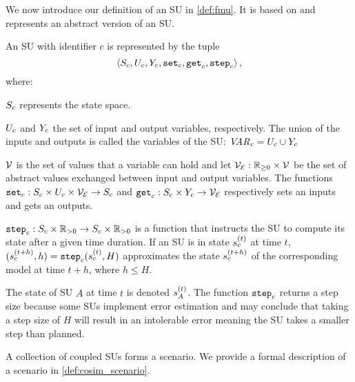 We now introduce our definition of an SU in \cref{def:fmu}.
It is based on \cite{Broman2013,Gomes2019c,thrane2021} and represents an abstract version of an SU.

\begin{definition}\label{def:fmu}
  An SU with identifier $c$ is represented by the tuple
  $$ \left\langle S_{c}, U_{c}, Y_{c}, \mathtt{set}_{c}, \mathtt{get}_{c}, \mathtt{step}_{c} \right\rangle ,$$
  where:
  \begin{compactitem}
    \item $S_{c}$ represents the state space.
    \item $U_{c}$ and $Y_{c}$ the set of input and output variables, respectively.
    The union of the inputs and outputs is called the variables of the SU:
    $\mathit{VAR_{c}} = U_{c} \cup Y_{c}$ 
    \item $\mathcal{V}$ is the set of values that a variable can hold and let $\mathcal{V_{E}} : \mathbb{R}_{\geq 0} \times \mathcal{V}$ be the set of abstract values exchanged between input and output variables.
    The functions
    $\mathtt{set}_{c} : S_{c} \times U_{c} \times \mathcal{V_{E}} \to S_{c}$ and $\mathtt{get}_{c}: S_{c} \times Y_{c} \to \mathcal{V_{E}}$ respectively sets an inputs and gets an outputs. 
    \item $\mathtt{step}_{c}: S_{c} \times \mathbb{R}_{> 0} \to S_{c} \times \mathbb{R}_{> 0} $ is a function that instructs the SU to compute its state after a given time duration. If an SU is in state $s_{c}^{(t)}$ at time $t$, $(s_{c}^{(t+h)}, h) = \mathtt{step}_{c}(s_{c}^{(t)}, H)$ approximates the state $s_{c}^{(t+h)}$ of the corresponding model at time $t+h$, where $h \leq H$. 
  \end{compactitem}
\end{definition}

The state of SU $A$ at time $t$ is denoted $s_{A}^{(t)}$.
The function $\mathtt{step}_{c}$ returns a step size because some SUs implement error estimation and may conclude that taking a step size of $H$ will result in an intolerable error meaning the SU takes a smaller step than planned.

A collection of coupled SUs forms a scenario.
We provide a formal description of a scenario in \cref{def:cosim_scenario}.

